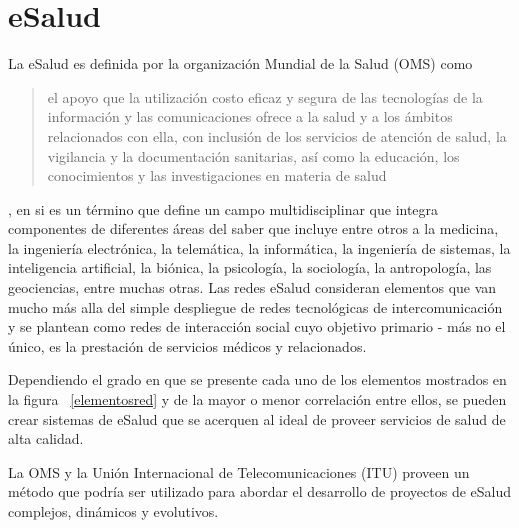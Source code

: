 \section{eSalud}

La eSalud es definida por la organización Mundial de la Salud (OMS) \cite{oms2016} como \begin{quote}el apoyo que la utilización costo eficaz y segura de las tecnologías de la información y las comunicaciones ofrece a la salud y a los ámbitos relacionados con ella, con inclusión de los servicios de atención de salud, la vigilancia y la documentación sanitarias, así como la educación, los conocimientos y las investigaciones en materia de salud\end{quote}, en si es un término que define un campo multidisciplinar que integra componentes de diferentes áreas del saber que incluye entre otros a la medicina, la ingeniería electrónica, la telemática, la informática, la ingeniería de sistemas, la inteligencia artificial, la biónica, la psicología, la sociología, la antropología, las geociencias, entre muchas otras. Las redes eSalud consideran elementos que van mucho más alla del simple despliegue de redes tecnológicas de intercomunicación y se plantean como redes de interacción social cuyo objetivo primario - más no el único, es la prestación de servicios médicos y relacionados.

Dependiendo el grado en que se presente cada uno de los elementos mostrados en la figura ~\ref{elementosred} y de la mayor o menor correlación entre ellos, se pueden crear sistemas de eSalud que se acerquen al ideal de proveer servicios de salud de alta calidad. 


La OMS y la Unión Internacional de Telecomunicaciones (ITU) proveen \cite{ituoms2012} un método que podría ser utilizado para abordar el desarrollo de proyectos de eSalud complejos, dinámicos y evolutivos. 

